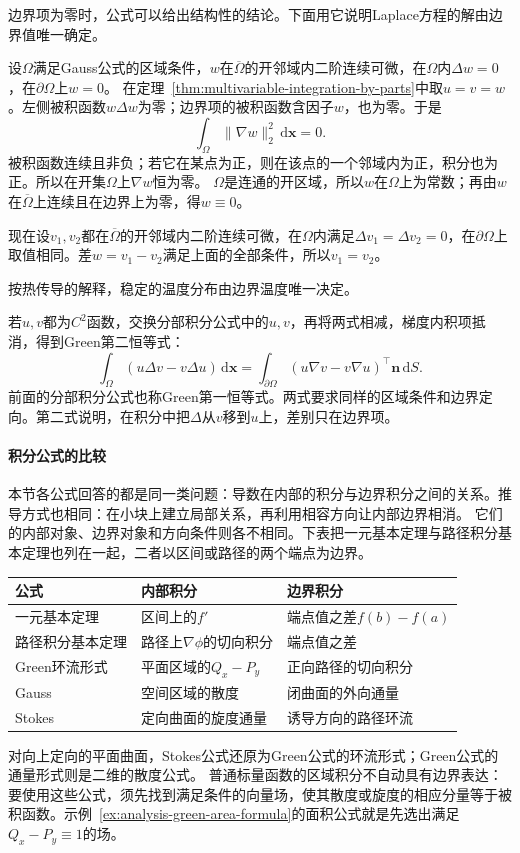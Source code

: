 边界项为零时，公式可以给出结构性的结论。下面用它说明Laplace方程的解由边界值唯一确定。
\begin{example}[Laplace方程的解由边界值决定]
设$\Omega$满足Gauss公式的区域条件，$w$在$\overline\Omega$的开邻域内二阶连续可微，在$\Omega$内$\Delta w=0$，在$\partial\Omega$上$w=0$。
在定理~\ref{thm:multivariable-integration-by-parts}中取$u=v=w$。左侧被积函数$w\Delta w$为零；边界项的被积函数含因子$w$，也为零。于是
\[
 \int_\Omega\lVert\nabla w\rVert_2^2\,\mathrm d\bm x=0.
\]
被积函数连续且非负；若它在某点为正，则在该点的一个邻域内为正，积分也为正。所以在开集$\Omega$上$\nabla w$恒为零。
$\Omega$是连通的开区域，所以$w$在$\Omega$上为常数；再由$w$在$\overline\Omega$上连续且在边界上为零，得$w\equiv0$。

现在设$v_1,v_2$都在$\overline\Omega$的开邻域内二阶连续可微，在$\Omega$内满足$\Delta v_1=\Delta v_2=0$，在$\partial\Omega$上取值相同。差$w=v_1-v_2$满足上面的全部条件，所以$v_1=v_2$。
\end{example}
按热传导的解释，稳定的温度分布由边界温度唯一决定。

若$u,v$都为$C^2$函数，交换分部积分公式中的$u,v$，再将两式相减，梯度内积项抵消，得到Green第二恒等式：
\begin{equation}
 \int_\Omega (u\Delta v-v\Delta u)\,\mathrm d\bm x
 =\int_{\partial\Omega}(u\nabla v-v\nabla u)^\top\bm n\,\mathrm dS.
 \label{eq:multivariable-green-second-identity}
\end{equation}
前面的分部积分公式也称Green第一恒等式。两式要求同样的区域条件和边界定向。第二式说明，在积分中把$\Delta$从$v$移到$u$上，差别只在边界项。

\paragraph{积分公式的比较}

本节各公式回答的都是同一类问题：导数在内部的积分与边界积分之间的关系。推导方式也相同：在小块上建立局部关系，再利用相容方向让内部边界相消。
它们的内部对象、边界对象和方向条件则各不相同。下表把一元基本定理与路径积分基本定理也列在一起，二者以区间或路径的两个端点为边界。
\begin{center}
\begin{tabular}{lll}
\toprule
公式 & 内部积分 & 边界积分\\
\midrule
一元基本定理 & 区间上的$f'$ & 端点值之差$f(b)-f(a)$\\
路径积分基本定理 & 路径上$\nabla\phi$的切向积分 & 端点值之差\\
Green环流形式 & 平面区域的$Q_x-P_y$ & 正向路径的切向积分\\
Gauss & 空间区域的散度 & 闭曲面的外向通量\\
Stokes & 定向曲面的旋度通量 & 诱导方向的路径环流\\
\bottomrule
\end{tabular}
\end{center}
对向上定向的平面曲面，Stokes公式还原为Green公式的环流形式；Green公式的通量形式则是二维的散度公式。
普通标量函数的区域积分不自动具有边界表达：要使用这些公式，须先找到满足条件的向量场，使其散度或旋度的相应分量等于被积函数。示例~\ref{ex:analysis-green-area-formula}的面积公式就是先选出满足$Q_x-P_y\equiv1$的场。

